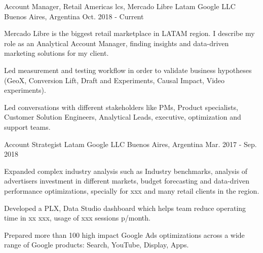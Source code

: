 

\begin{cventries}

  \cventry
    {Account Manager, Retail Americas lcs, Mercado Libre Latam} %
    {Google LLC} %
    {Buenos Aires, Argentina} %
    {Oct. 2018 - Current} %
    {
      \begin{cvitems} %
        \item {Mercado Libre is the biggest retail marketplace in LATAM region. I describe my role as an Analytical Account Manager, finding insights and data-driven marketing solutions for my client.}
        \item {Led measurement and testing workflow in order to validate business hypotheses (GeoX, Conversion Lift, Draft and Experiments, Causal Impact, Video experiments).}
        \item {Led conversations with different stakeholders like PMs, Product specialists, Customer Solution Engineers, Analytical Leads, executive, optimization and support teams.}
      \end{cvitems}
    }

  \cventry
    {Account Strategist Latam} %
    {Google LLC} %
    {Buenos Aires, Argentina} %
    {Mar. 2017 - Sep. 2018} %
    {
      \begin{cvitems} %
        \item {Expanded complex industry analysis such as Industry benchmarks, analysis of advertisers investment in different markets, budget forecasting and data-driven performance optimizations, specially for xxx and many retail clients in the region.}
        \item {Developed a PLX, Data Studio dashboard which helps team reduce operating time in xx xxx, usage of xxx sessions p/month.}
        \item {Prepared more than 100 high impact Google Ads optimizations across a wide range of Google products: Search, YouTube, Display, Apps.}
      \end{cvitems}
    }


\end{cventries}
